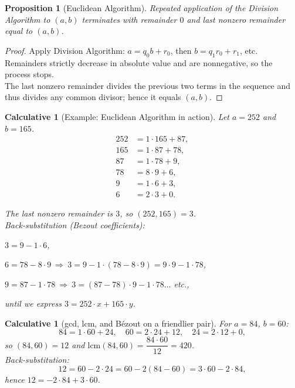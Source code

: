 \documentclass[12pt]{article}
\newtheorem{proposition}[theorem]{Proposition}
\newtheorem{calculative}[theorem]{Calculative}
\theoremstyle{definition}
\begin{document}
\dotfill

\begin{proposition}[Euclidean Algorithm]
Repeated application of the Division Algorithm to $(a,b)$ terminates with remainder $0$ and last nonzero remainder equal to $(a,b)$.
\end{proposition}

\vspace{1em}

\begin{proof}
Apply Division Algorithm: $a = q_0 b + r_0$, then $b = q_1 r_0 + r_1$, etc. \\

\noindent
Remainders strictly decrease in absolute value and are nonnegative, so the process stops. \\

\noindent
The last nonzero remainder divides the previous two terms in the sequence and thus divides any common divisor; hence it equals $(a,b)$.
\end{proof}

\dotfill

\begin{calculative}[Example: Euclidean Algorithm in action]

\noindent
Let $a=252$ and $b=165$.
\[
\begin{aligned}
252 &= 1\cdot 165 + 87,\\
165 &= 1\cdot 87 + 78,\\
87 &= 1\cdot 78 + 9,\\
78 &= 8\cdot 9 + 6,\\
9 &= 1\cdot 6 + 3,\\
6 &= 2\cdot 3 + 0.
\end{aligned}
\]

\noindent
The last nonzero remainder is $3$, so $(252,165)=3$.\\

\noindent
Back-substitution (Bezout coefficients):

$3 = 9 - 1\cdot 6$,

$6 = 78 - 8\cdot 9 \ \Rightarrow\ 3 = 9 - 1\cdot (78 - 8\cdot 9) = 9\cdot 9 - 1\cdot 78$,

$9 = 87 - 1\cdot 78 \ \Rightarrow\ 3 = (87 - 78)\cdot 9 - 1\cdot 78 \ldots$ etc.,

until we express $3 = 252\cdot x + 165\cdot y$.
\end{calculative}

\dotfill

\begin{calculative}[gcd, lcm, and B\'ezout on a friendlier pair]

\noindent
For $a=84$, $b=60$:
\[
84=1\cdot 60+24,\quad 60=2\cdot 24+12,\quad 24=2\cdot 12+0,
\]
so $(84,60)=12$ and $\mathrm{lcm}(84,60)=\dfrac{84\cdot 60}{12}=420$.\\

\noindent
Back-substitution:
\[
12=60-2\cdot 24=60-2(84-60)=3\cdot 60-2\cdot 84,
\]
hence $12=-2\cdot 84+3\cdot 60$.
\end{calculative}
\end{document}
